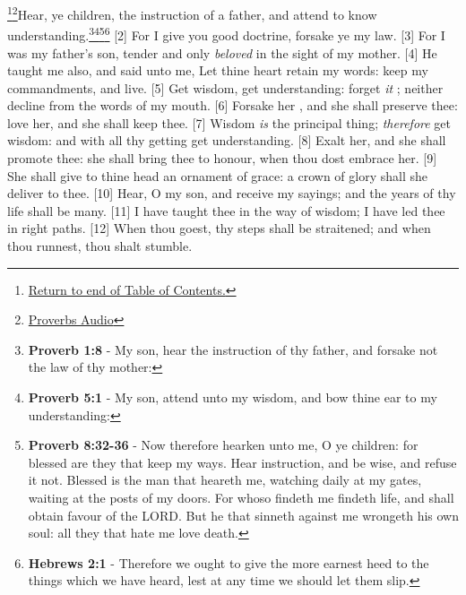 \footnote{\textcolor[cmyk]{0.99998,1,0,0}{\hyperlink{TOC}{Return to end of Table of Contents.}}}\footnote{\href{https://audiobible.com/bible/bible.html}{\textcolor[cmyk]{0.99998,1,0,0}{Proverbs Audio}}}\textcolor[cmyk]{0.99998,1,0,0}{Hear, ye children, the instruction of a father, and attend to know understanding.}\footnote{\textbf{Proverb 1:8} - My son, hear the instruction of thy father, and forsake not the law of thy mother:}\footnote{\textbf{Proverb 5:1} - My son, attend unto my wisdom, and bow thine ear to my understanding:}\footnote{\textbf{Proverb 8:32-36} - Now therefore hearken unto me, O ye children: for blessed are they that keep my ways. Hear instruction, and be wise, and refuse it not. Blessed is the man that heareth me, watching daily at my gates, waiting at the posts of my doors. For whoso findeth me findeth life, and shall obtain favour of the LORD. But he that sinneth against me wrongeth his own soul: all they that hate me love death.}\footnote{\textbf{Hebrews 2:1} - Therefore we ought to give the more earnest heed to the things which we have heard, lest at any time we should let them slip.}
[2] \textcolor[cmyk]{0.99998,1,0,0}{For I give you good doctrine, forsake ye  my law.}
[3] \textcolor[cmyk]{0.99998,1,0,0}{For I was my father's son, tender and only \emph{beloved} in the sight of my mother.}
[4] \textcolor[cmyk]{0.99998,1,0,0}{He taught me also, and said unto me, Let thine heart retain my words: keep my commandments, and live.}
[5] \textcolor[cmyk]{0.99998,1,0,0}{Get wisdom, get understanding: forget \emph{it} ; neither decline from the words of my mouth.}
[6] \textcolor[cmyk]{0.99998,1,0,0}{Forsake her , and she shall preserve thee: love her, and she shall keep thee.}
[7] \textcolor[cmyk]{0.99998,1,0,0}{Wisdom \emph{is} the principal thing; \emph{therefore} get wisdom: and with all thy getting get understanding.}
[8] \textcolor[cmyk]{0.99998,1,0,0}{Exalt her, and she shall promote thee: she shall bring thee to honour, when thou dost embrace her.}
[9] \textcolor[cmyk]{0.99998,1,0,0}{She shall give to thine head an ornament of grace: a crown of glory shall she deliver to thee.}
[10] \textcolor[cmyk]{0.99998,1,0,0}{Hear, O my son, and receive my sayings; and the years of thy life shall be many.}
[11] \textcolor[cmyk]{0.99998,1,0,0}{I have taught thee in the way of wisdom; I have led thee in right paths.}
[12] \textcolor[cmyk]{0.99998,1,0,0}{When thou goest, thy steps shall  be straitened; and when thou runnest, thou shalt  stumble.}
